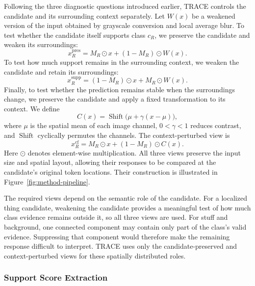 \documentclass[letterpaper]{article}
\begin{document}
	Following the three diagnostic questions introduced earlier, TRACE controls the candidate and its surrounding context separately. Let $W(x)$ be a weakened version of the input obtained by grayscale conversion and local average blur. To test whether the candidate itself supports class $c_R$, we preserve the candidate and weaken its surroundings:
	\begin{equation}
		x_R^{\mathrm{pres}}
		=
		M_R\odot x
		+
		(1-M_R)\odot W(x).
	\end{equation}
	To test how much support remains in the surrounding context, we weaken the candidate and retain its surroundings:
	\begin{equation}
		x_R^{\mathrm{supp}}
		=
		(1-M_R)\odot x
		+
		M_R\odot W(x).
	\end{equation}
	Finally, to test whether the prediction remains stable when the surroundings change, we preserve the candidate and apply a fixed transformation to its context. We define
	\begin{equation}
		C(x)
		=
		\operatorname{Shift}
		\bigl(
		\mu+\gamma(x-\mu)
		\bigr),
	\end{equation}
	where $\mu$ is the spatial mean of each image channel, $0<\gamma<1$ reduces contrast, and $\operatorname{Shift}$ cyclically permutes the channels. The context-perturbed view is
	\begin{equation}
		x_R^{\mathrm{cf}}
		=
		M_R\odot x
		+
		(1-M_R)\odot C(x).
	\end{equation}
	Here $\odot$ denotes element-wise multiplication. All three views preserve the input size and spatial layout, allowing their responses to be compared at the candidate's original token locations. Their construction is illustrated in Figure~\ref{fig:method-pipeline}.
	
	The required views depend on the semantic role of the candidate. For a localized thing candidate, weakening the candidate provides a meaningful test of how much class evidence remains outside it, so all three views are used. For stuff and background, one connected component may contain only part of the class's valid evidence. Suppressing that component would therefore make the remaining response difficult to interpret. TRACE uses only the candidate-preserved and context-perturbed views for these spatially distributed roles.
	
	\subsubsection{Support Score Extraction}
	
\end{document}
